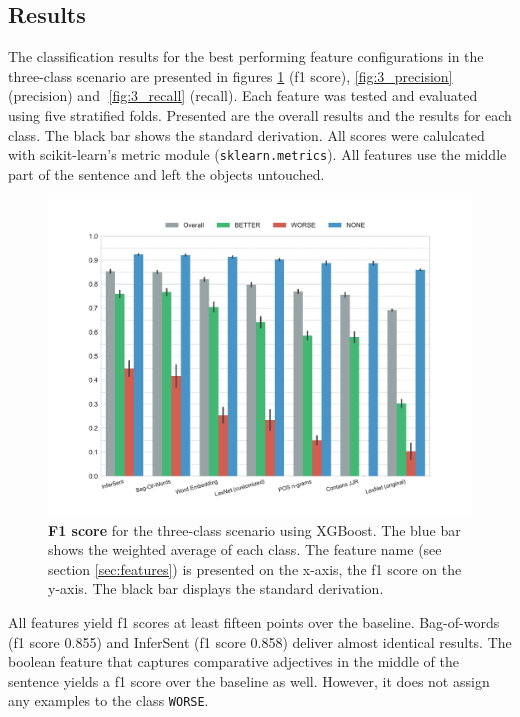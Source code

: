 \subsection{Results}
\label{sec:3_results}
The classification results for the best performing feature configurations in the three-class scenario are presented in figures \ref{fig:3_f1} (f1 score), \ref{fig:3_precision} (precision) and \ref{fig:3_recall} (recall). Each feature was tested and evaluated using five stratified folds. Presented are the overall results and the results for each class. The black bar shows the standard derivation. All scores were calulcated with scikit-learn's metric module (\texttt{sklearn.metrics}). All features use the middle part of the sentence and left the objects untouched.


\begin{figure}[h]
      \caption{\textbf{F1 score} for the three-class scenario using XGBoost. The blue bar shows the weighted average of each class. The feature name (see section \ref{sec:features}) is presented on the x-axis, the f1 score on the y-axis. The black bar displays the standard derivation.} 
    \label{fig:3_f1}
 \centering
	\includegraphics[width=1\textwidth]{images/experiments/f1-False}

\end{figure}

All features yield f1 scores at least fifteen points over the baseline. Bag-of-words (f1 score 0.855) and InferSent (f1 score 0.858) deliver almost identical results. The boolean feature that captures comparative adjectives in the middle of the sentence yields a f1 score over the baseline as well. However, it does not assign any examples to the class \texttt{WORSE}.



